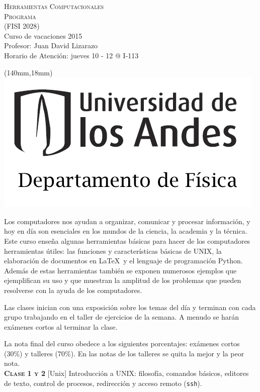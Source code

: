 \documentclass[letterpaper,10pt,onecolumn]{article}
\begin{document}
\begin{flushleft}

\textsc{\LARGE Herramientas Computacionales}\\[0.01cm]

\Large \textsc{Programa}\\[0.1cm]
\normalsize (FISI 2028) \\
Curso de vacaciones 2015 \\
Profesor: Juan David Lizarazo \\
Horario de Atención: jueves 10 - 12 @ I-113

\end{flushleft}

		\begin{textblock*}{20mm}(140mm,18mm)
  			\includegraphics[height=29 mm]{andes.png}
		\end{textblock*}

\vspace{0.2cm}
\addtocounter{mysection}{0}

\normalsize Los computadores nos ayudan a organizar, comunicar y procesar información, y hoy en día son esenciales en los mundos de la ciencia, la academia y la técnica. Este curso enseña algunas herramientas  básicas para hacer de los computadores herramientas útiles: las funciones y características básicas de UNIX, la elaboración de documentos en \LaTeX $\,$ y el lenguaje de programación Python. Además de estas herramientas también se exponen numerosos ejemplos que ejemplifican su uso y que muestran la amplitud de los problemas que pueden resolverse con la ayuda de los computadores. 

 Las clases inician con una exposición sobre los temas del día y terminan con cada grupo trabajando en el taller de ejercicios de la semana. A menudo se harán exámenes cortos al terminar la clase. 

 La nota final del curso obedece a los siguientes porcentajes: exámenes cortos (30\%) y talleres (70\%). En las notas de los talleres se quita la mejor y la peor nota.\\[0.1cm]


\noindent\normalsize \textbf{\textsc{Clase 1 y 2}} [Unix] Introducción a UNIX: filosofía, comandos básicos, editores de texto, control de procesos, redirección y acceso remoto (\verb+ssh+).\\[-0.3cm]
\end{document}
